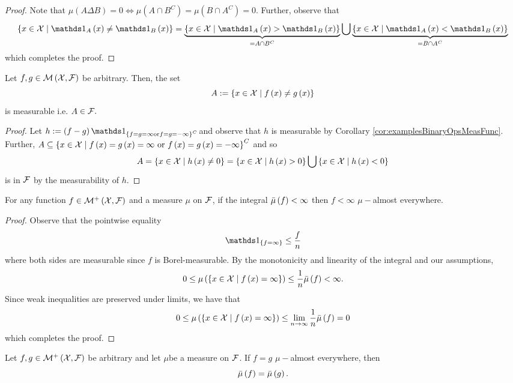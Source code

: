 \begin{proof}
Note that $\mu\left(A\Delta B\right)=0\Longleftrightarrow\mu\left(A\cap B^{C}\right)=\mu\left(B\cap A^{C}\right)=0.$
Further, observe that
\[
\left\{ x\in\X\mid\indicate_{A}\left(x\right)\neq\indicate_{B}\left(x\right)\right\} =\underbrace{\left\{ x\in\X\mid\indicate_{A}\left(x\right)>\indicate_{B}\left(x\right)\right\} }_{=A\cap B^{C}}\bigcup\underbrace{\left\{ x\in\X\mid\indicate_{A}\left(x\right)<\indicate_{B}\left(x\right)\right\} }_{=B\cap A^{C}}
\]
which completes the proof.
\end{proof}
\begin{lem}
\label{lem:setFuncNotEqualMeasurable}Let $f,g\in\mathcal{M}\left(\mathcal{X},\mathcal{F}\right)$
be arbitrary. Then, the set
\[
A:=\left\{ x\in\mathcal{X}\mid f\left(x\right)\neq g\left(x\right)\right\} 
\]
is measurable i.e. $A\in\mathcal{F}.$
\end{lem}

\begin{proof}
Let $h:=\left(f-g\right)\indicate_{\left\{ f=g=\infty\textnormal{or}f=g=-\infty\right\} ^{C}}$and
observe that $h$ is measurable by Corollary \ref{cor:examplesBinaryOpsMeasFunc}.
Further, $A\subseteq\left\{ x\in\mathcal{X}\mid f\left(x\right)=g\left(x\right)=\infty\textnormal{ or }f\left(x\right)=g\left(x\right)=-\infty\right\} ^{C}$
and so
\[
A=\left\{ x\in\mathcal{X}\mid h\left(x\right)\neq0\right\} =\left\{ x\in\mathcal{X}\mid h\left(x\right)>0\right\} \bigcup\left\{ x\in\mathcal{X}\mid h\left(x\right)<0\right\} 
\]
is in $\mathcal{F}$ by the measurability of $h$.
\end{proof}
\begin{prop}
\label{prop:intFiniteFuncFinite}For any function $f\in\mathcal{M}^{+}\left(\mathcal{X},\mathcal{F}\right)$
and a measure $\mu$ on $\mathcal{F}$, if the integral $\bar{\mu}\left(f\right)<\infty$
then $f<\infty$ $\mu-$almost everywhere.
\end{prop}

\begin{proof}
Observe that the pointwise equality
\[
\indicate_{\left\{ f=\infty\right\} }\leq\frac{f}{n}
\]
where both sides are measurable since $f$ is Borel-measurable. By
the monotonicity and linearity of the integral and our assumptions,
\[
0\leq\mu\left(\left\{ x\in\mathcal{X}\mid f\left(x\right)=\infty\right\} \right)\leq\frac{1}{n}\bar{\mu}\left(f\right)<\infty.
\]
Since weak inequalities are preserved under limits, we have that 
\[
0\leq\mu\left(\left\{ x\in\mathcal{X}\mid f\left(x\right)=\infty\right\} \right)\leq\lim_{n\to\infty}\frac{1}{n}\bar{\mu}\left(f\right)=0
\]
which completes the proof.
\end{proof}
\begin{prop}
\label{prop:funcEqualityAlmostEverywhere}Let $f,g\in\mathcal{M}^{+}\left(\mathcal{X},\mathcal{F}\right)$
be arbitrary and let $\mu$be a measure on $\mathcal{F}$. If $f=g$ $\mu-$almost
everywhere, then 
\[
\bar{\mu}\left(f\right)=\bar{\mu}\left(g\right).
\]
\end{prop}

